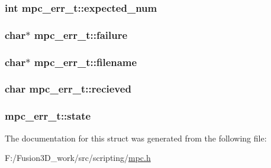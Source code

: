 \subsubsection[{expected\+\_\+num}]{\setlength{\rightskip}{0pt plus 5cm}int mpc\+\_\+err\+\_\+t\+::expected\+\_\+num}\label{structmpc__err__t_ae577756565dd7a3cbc734ef8257d529c}
\hypertarget{structmpc__err__t_ae49eac3061b0608446f80b168cebbbc0}{}
\subsubsection[{failure}]{\setlength{\rightskip}{0pt plus 5cm}char$\ast$ mpc\+\_\+err\+\_\+t\+::failure}\label{structmpc__err__t_ae49eac3061b0608446f80b168cebbbc0}
\hypertarget{structmpc__err__t_ae775901278f5c56fc3c5f95ae0ba2bc0}{}
\subsubsection[{filename}]{\setlength{\rightskip}{0pt plus 5cm}char$\ast$ mpc\+\_\+err\+\_\+t\+::filename}\label{structmpc__err__t_ae775901278f5c56fc3c5f95ae0ba2bc0}
\hypertarget{structmpc__err__t_a63ece2ebc4e4df2ebd89bebfddde7984}{}
\subsubsection[{recieved}]{\setlength{\rightskip}{0pt plus 5cm}char mpc\+\_\+err\+\_\+t\+::recieved}\label{structmpc__err__t_a63ece2ebc4e4df2ebd89bebfddde7984}
\hypertarget{structmpc__err__t_ae853dbb8233311c81426d93839e5fae7}{}
\subsubsection[{state}]{ mpc\+\_\+err\+\_\+t\+::state}\label{structmpc__err__t_ae853dbb8233311c81426d93839e5fae7}


The documentation for this struct was generated from the following file\+:\begin{DoxyCompactItemize}
\item 
F\+:/\+Fusion3\+D\+\_\+work/src/scripting/\hyperlink{mpc_8h}{mpc.\+h}\end{DoxyCompactItemize}
